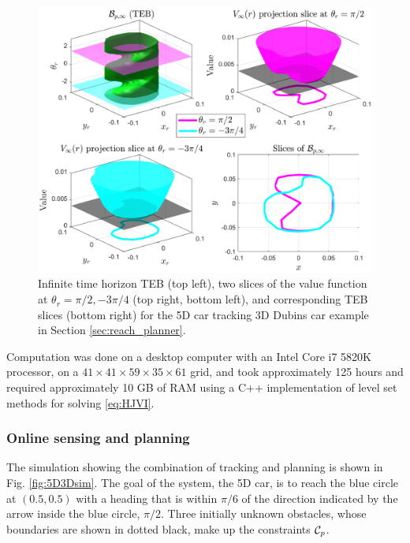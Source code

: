 \begin{figure}
	\includegraphics[width=\columnwidth]{fig/ti_valfunc_5d3d}
	\caption{Infinite time horizon TEB (top left), two slices of the value function at $\theta_r = \pi/2, -3\pi/4$ (top right, bottom left), and corresponding TEB slices (bottom right) for the 5D car tracking 3D Dubins car example in Section \ref{sec:reach_planner}.}
	\label{fig:vf_TEB:5D3D}  
\end{figure}

Computation was done on a desktop computer with an Intel Core i7 5820K processor, on a $41\times41\times59\times35\times61$ grid, and took approximately 125 hours and required approximately 10 GB of RAM using a C++ implementation of level set methods for solving \eqref{eq:HJVI}. 

\subsubsection{Online sensing and planning}
The simulation showing the combination of tracking and planning is shown in Fig. \ref{fig:5D3Dsim}.
The goal of the system, the 5D car, is to reach the blue circle at $(0.5, 0.5)$ with a heading that is within $\pi/6$ of the direction indicated by the arrow inside the blue circle, $\pi/2$.
Three initially unknown obstacles, whose boundaries are shown in dotted black, make up the constraints $\mathcal C_p$.

